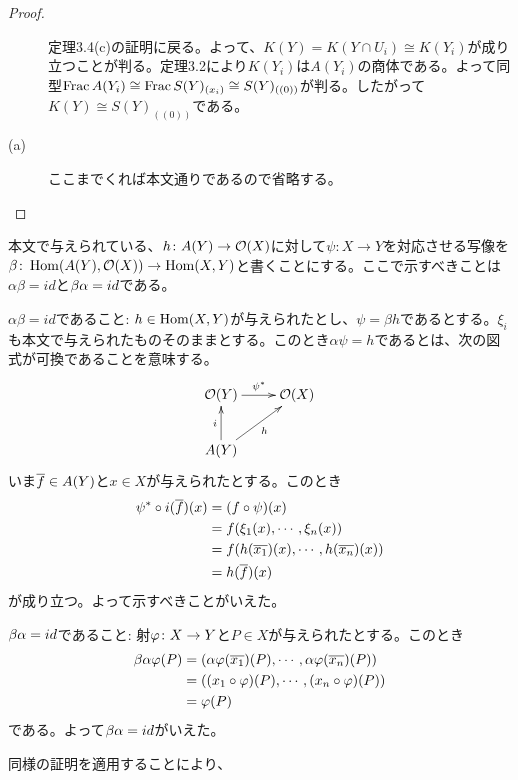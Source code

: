 \begin{proof}
\begin{description}
定理3.4(c)の証明に戻る。よって、$K(Y) = K(Y \cap U_i) \cong K(Y_i)$が成り立つことが判る。定理3.2により$K(Y_i)$は$A(Y_i)$の商体である。よって同型$\operatorname{Frac} A(Y_i) \cong \operatorname{Frac} S(Y)_{(x_i)} \cong S(Y)_{((0))}$が判る。したがって$K(Y) \cong S(Y)_{((0))}$である。

\item[(a)] ここまでくれば本文通りであるので省略する。

\end{description}
\end{proof}




\begin{rem}
  本文で与えられている、$h \colon A(Y) \to \mathcal{O}(X)$に対して$\psi \colon X \to Y$を対応させる写像を$\beta \colon \operatorname{Hom}(A(Y), \mathcal{O}(X)) \to \operatorname{Hom} (X,Y)$と書くことにする。ここで示すべきことは$\alpha \beta = id$と$\beta {\alpha} = id$である。

  $\alpha \beta = id$であること: $h \in \operatorname{Hom}(X,Y)$が与えられたとし、$\psi = \beta h$であるとする。$\xi_i$も本文で与えられたものそのままとする。このとき$\alpha \psi = h$であるとは、次の図式が可換であることを意味する。
  \[
  \xymatrix{
  \calo(Y) \ar[r]^{\psi^*} & \calo(X) \\
  A(Y) \ar[u]^i \ar[ur]_h & {}
  }
  \]
  いま$\overline{f} \in A(Y)$と$x \in X$が与えられたとする。このとき
  \begin{align*}
    \psi^* \circ i(\overline{f})(x) &= (f \circ \psi )(x) \\
    &= f(\xi_1(x), \cdots , \xi_n(x)) \\
    &= f(h(\overline{x_1})(x), \cdots , h(\overline{x_n})(x)  ) \\
    &= h(\overline{f})(x)
  \end{align*}
  が成り立つ。よって示すべきことがいえた。

  $\beta {\alpha} = id$であること: 射${\varphi} \colon X \to Y$と$P \in X$が与えられたとする。このとき
  \begin{align*}
    \beta {\alpha} {\varphi}(P) &= ({\alpha} {\varphi}(\overline{x_1})(P), \cdots ,  {\alpha} {\varphi}(\overline{x_n})(P)) \\
    &= ((x_1 \circ {\varphi})(P), \cdots , (x_n \circ {\varphi})(P) ) \\
    &= {\varphi}(P)
  \end{align*}
  である。よって$\beta {\alpha} = id$がいえた。
\end{rem}


\begin{rem}
  同様の証明を適用することにより、
\end{rem}


